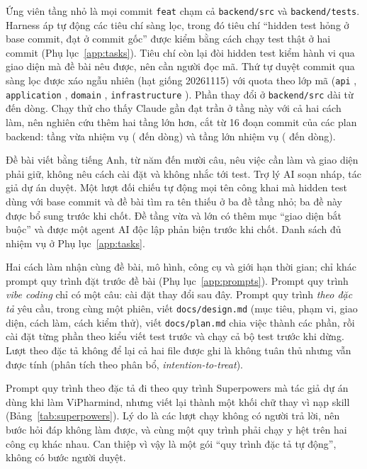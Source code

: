 Ứng viên tầng nhỏ là mọi commit \texttt{feat} chạm cả \texttt{backend/src} và \texttt{backend/tests}. Harness
áp tự động các tiêu chí sàng lọc, trong đó tiêu chí ``hidden test hỏng ở base commit, đạt ở commit gốc'' được kiểm bằng
cách chạy test thật ở hai commit (Phụ lục~\ref{app:tasks}). Tiêu chí còn lại đòi hidden test kiểm hành vi qua
giao diện mà đề bài nêu được, nên cần người đọc mã. Thứ tự duyệt \NumEligibleStratifiable{} commit qua sàng
lọc được xáo ngẫu nhiên (hạt giống 20261115) với quota theo lớp mã (\texttt{api} \NumTasksApi{},
\texttt{application} \NumTasksApplication{}, \texttt{domain} \NumTasksDomain{}, \texttt{infrastructure}
\NumTasksInfrastructure{}). Phần thay đổi ở \texttt{backend/src} dài từ \NumTaskSrcLinesMin{} đến
\NumTaskSrcLinesMax{} dòng. Chạy thử cho thấy Claude gần đạt trần ở tầng này với cả hai cách làm, nên nghiên
cứu thêm hai tầng lớn hơn, cắt từ 16 đoạn commit của các plan backend: tầng vừa \NumMediumTasks{} nhiệm vụ
(\NumMediumSrcLinesMin{} đến \NumMediumSrcLinesMax{} dòng) và tầng lớn \NumFeatureTasks{} nhiệm vụ
(\NumFeatureSrcLinesMin{} đến \NumFeatureSrcLinesMax{} dòng).

Đề bài viết bằng tiếng Anh, từ năm đến mười câu, nêu việc cần làm và giao diện phải giữ, không nêu cách cài
đặt và không nhắc tới test. Trợ lý AI soạn nháp, tác giả dự án duyệt. Một lượt đối chiếu tự động mọi tên công
khai mà hidden test dùng với base commit và đề bài tìm ra tên thiếu ở ba đề tầng nhỏ; ba đề này được bổ
sung trước khi chốt. Đề tầng vừa và lớn có thêm mục ``giao diện bắt buộc'' và
được một agent AI độc lập phản biện trước khi chốt. Danh sách đủ nhiệm vụ ở Phụ lục~\ref{app:tasks}.

Hai cách làm nhận cùng đề bài, mô hình, công cụ và giới hạn thời gian; chỉ khác prompt quy trình đặt trước đề bài
(Phụ lục~\ref{app:prompts}). Prompt quy trình \emph{vibe coding} chỉ có một câu: cài đặt thay đổi sau đây. Prompt quy trình
\emph{theo đặc tả} yêu cầu, trong cùng một phiên, viết \texttt{docs/design.md} (mục tiêu, phạm vi, giao diện,
cách làm, cách kiểm thử), viết \texttt{docs/plan.md} chia việc thành các phần, rồi cài đặt từng phần theo kiểu
viết test trước và chạy cả bộ test trước khi dừng. Lượt theo đặc tả không để lại cả hai file được ghi là không
tuân thủ nhưng vẫn được tính (phân tích theo phân bổ, \emph{intention-to-treat}).

Prompt quy trình theo đặc tả đi theo quy trình Superpowers mà tác giả dự án dùng khi làm ViPharmind, nhưng viết lại
thành một khối chữ thay vì nạp skill (Bảng~\ref{tab:superpowers}). Lý do là các lượt chạy không có người trả
lời, nên bước hỏi đáp không làm được, và cùng một quy trình phải chạy y hệt trên hai công cụ khác nhau. Can
thiệp vì vậy là một gói ``quy trình đặc tả tự động'', không có bước người duyệt.

